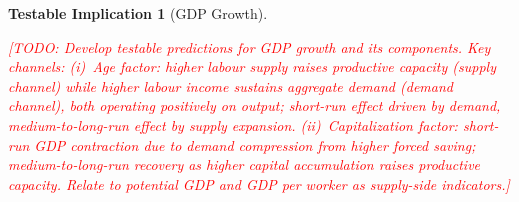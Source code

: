 \documentclass[11pt,english,a4paper, twoside, authoryear]{article}
\newtheorem{testable}{Testable Implication}}
\begin{document}
\begin{testable}[GDP Growth]\label{test:gdp}

\textcolor{red}{[TODO: Develop testable predictions for GDP growth and its components. Key channels: (i)~\textit{Age factor}: higher labour supply raises productive capacity (supply channel) while higher labour income sustains aggregate demand (demand channel), both operating positively on output; short-run effect driven by demand, medium-to-long-run effect by supply expansion. (ii)~\textit{Capitalization factor}: short-run GDP contraction due to demand compression from higher forced saving; medium-to-long-run recovery as higher capital accumulation raises productive capacity. Relate to potential GDP and GDP per worker as supply-side indicators.]}

\end{testable}
\end{document}
